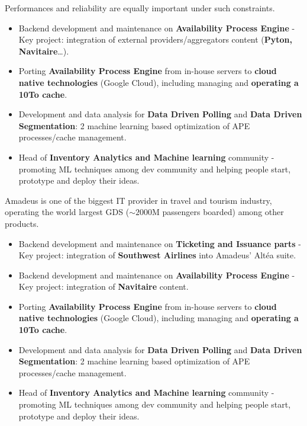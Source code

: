 \documentclass[10pt, a4paper, ragged2e]{altacv}
\begin{document}
		\medskip
		Performances and reliability are equally important under such constraints.

		\medskip
		\begin{itemize}
			\item Backend development and maintenance on \textbf{Availability Process Engine} - Key project: integration of external providers/aggregators content (\textbf{Pyton, Navitaire}\ldots).
			\item Porting \textbf{Availability Process Engine} from in-house servers to \textbf{cloud native technologies} (Google Cloud), including managing and \textbf{operating a 10To cache}.
			\item Development and data analysis for \textbf{Data Driven Polling} and \textbf{Data Driven Segmentation}: 2 machine learning based optimization of APE processes/cache management.
			\item Head of \textbf{Inventory Analytics and Machine learning} community - promoting ML techniques among dev community and helping people start, prototype and deploy their ideas.
		\end{itemize}
	\divider


		
		Amadeus is one of the biggest IT provider in travel and tourism industry, operating the world largest GDS (${\sim}2000$M passengers boarded) among other products.
		
		\medskip
		\begin{itemize}
			\item Backend development and maintenance on \textbf{Ticketing and Issuance parts} - Key project: integration of \textbf{Southwest Airlines} into Amadeus' Altéa suite.
			\item Backend development and maintenance on \textbf{Availability Process Engine} - Key project: integration of \textbf{Navitaire} content.
			\item Porting \textbf{Availability Process Engine} from in-house servers to \textbf{cloud native technologies} (Google Cloud), including managing and \textbf{operating a 10To cache}.
			\item Development and data analysis for \textbf{Data Driven Polling} and \textbf{Data Driven Segmentation}: 2 machine learning based optimization of APE processes/cache management.
			\item Head of \textbf{Inventory Analytics and Machine learning} community - promoting ML techniques among dev community and helping people start, prototype and deploy their ideas.
		\end{itemize}
	\divider
\end{document}
